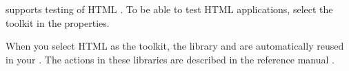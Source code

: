 \app{} supports testing of HTML \gdauts{}. To be able to test HTML applications, select the  toolkit in the \gdproject{} properties. 

When you select HTML as the \gdproject{} toolkit, the library \gdprojects{}  and   are automatically reused in your \gdproject{}. The actions in these libraries are described in the reference manual .
